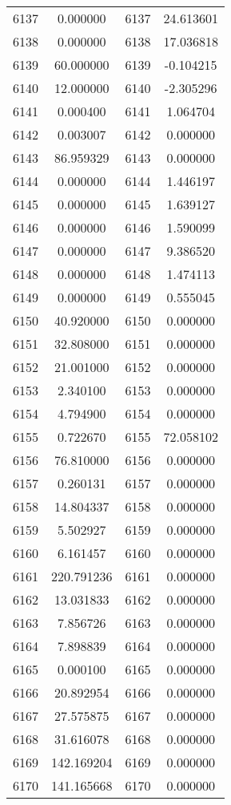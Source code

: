\documentclass[12pt]{article}
\begin{document}
\begin{longtable}{@{}cccc@{}}
6137 & 0.000000 & 6137 & 24.613601 \\
6138 & 0.000000 & 6138 & 17.036818 \\
6139 & 60.000000 & 6139 & -0.104215 \\
6140 & 12.000000 & 6140 & -2.305296 \\
6141 & 0.000400 & 6141 & 1.064704 \\
6142 & 0.003007 & 6142 & 0.000000 \\
6143 & 86.959329 & 6143 & 0.000000 \\
6144 & 0.000000 & 6144 & 1.446197 \\
6145 & 0.000000 & 6145 & 1.639127 \\
6146 & 0.000000 & 6146 & 1.590099 \\
6147 & 0.000000 & 6147 & 9.386520 \\
6148 & 0.000000 & 6148 & 1.474113 \\
6149 & 0.000000 & 6149 & 0.555045 \\
6150 & 40.920000 & 6150 & 0.000000 \\
6151 & 32.808000 & 6151 & 0.000000 \\
6152 & 21.001000 & 6152 & 0.000000 \\
6153 & 2.340100 & 6153 & 0.000000 \\
6154 & 4.794900 & 6154 & 0.000000 \\
6155 & 0.722670 & 6155 & 72.058102 \\
6156 & 76.810000 & 6156 & 0.000000 \\
6157 & 0.260131 & 6157 & 0.000000 \\
6158 & 14.804337 & 6158 & 0.000000 \\
6159 & 5.502927 & 6159 & 0.000000 \\
6160 & 6.161457 & 6160 & 0.000000 \\
6161 & 220.791236 & 6161 & 0.000000 \\
6162 & 13.031833 & 6162 & 0.000000 \\
6163 & 7.856726 & 6163 & 0.000000 \\
6164 & 7.898839 & 6164 & 0.000000 \\
6165 & 0.000100 & 6165 & 0.000000 \\
6166 & 20.892954 & 6166 & 0.000000 \\
6167 & 27.575875 & 6167 & 0.000000 \\
6168 & 31.616078 & 6168 & 0.000000 \\
6169 & 142.169204 & 6169 & 0.000000 \\
6170 & 141.165668 & 6170 & 0.000000 \\

\end{longtable}
\end{document}
